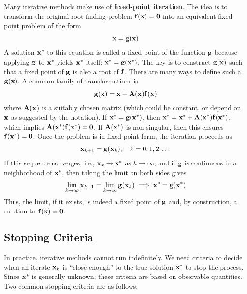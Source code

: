 Many iterative methods make use of  \textbf{fixed-point iteration}. The idea is to transform the original root-finding problem $\mathbf{f}(\mathbf{x}) = \mathbf{0}$ into an equivalent fixed-point problem of the form
\[
    \mathbf{x} = \mathbf{g}(\mathbf{x})
\]
A solution $\mathbf{x}^*$ to this equation is called a fixed point of the function $\mathbf{g}$ because applying $\mathbf{g}$ to $\mathbf{x}^*$ yields $\mathbf{x}^*$ itself: $\mathbf{x}^* = \mathbf{g}(\mathbf{x}^*)$. The key is to construct $\mathbf{g}(\mathbf{x})$ such that a fixed point of $\mathbf{g}$ is also a root of $\mathbf{f}$. There are many ways to define such a $\mathbf{g}(\mathbf{x})$. A common family of transformations is
\[
    \mathbf{g}(\mathbf{x}) = \mathbf{x} + \mathbf{A}(\mathbf{x})\mathbf{f}(\mathbf{x})
\]
where $\mathbf{A}(\mathbf{x})$ is a suitably chosen matrix (which could be constant, or depend on $\mathbf{x}$ as suggested by the notation). If $\mathbf{x}^* = \mathbf{g}(\mathbf{x}^*)$, then $\mathbf{x}^* = \mathbf{x}^* + \mathbf{A}(\mathbf{x}^*)\mathbf{f}(\mathbf{x}^*)$, which implies $\mathbf{A}(\mathbf{x}^*)\mathbf{f}(\mathbf{x}^*) = \mathbf{0}$. If $\mathbf{A}(\mathbf{x}^*)$ is non-singular, then this ensures $\mathbf{f}(\mathbf{x}^*) = \mathbf{0}$. Once the problem is in fixed-point form, the iteration proceeds as
\[
    \mathbf{x}_{k+1} = \mathbf{g}(\mathbf{x}_k), \quad k = 0, 1, 2, \dots
\]
If this sequence converges, i.e., $\mathbf{x}_k \to \mathbf{x}^*$ as $k \to \infty$, and if $\mathbf{g}$ is continuous in a neighborhood of $\mathbf{x}^*$, then taking the limit on both sides gives
\[ 
\lim_{k\to\infty} \mathbf{x}_{k+1} = \lim_{k\to\infty} \mathbf{g}(\mathbf{x}_k) \implies \mathbf{x}^* = \mathbf{g}(\mathbf{x}^*) 
\]
Thus, the limit, if it exists, is indeed a fixed point of $\mathbf{g}$ and, by construction, a solution to $\mathbf{f}(\mathbf{x}) = \mathbf{0}$.

\subsection{Stopping Criteria}
In practice, iterative methods cannot run indefinitely. We need criteria to decide when an iterate $\mathbf{x}_k$ is ``close enough'' to the true solution $\mathbf{x}^*$ to stop the process. Since $\mathbf{x}^*$ is generally unknown, these criteria are based on observable quantities. Two common stopping criteria are as follows:

